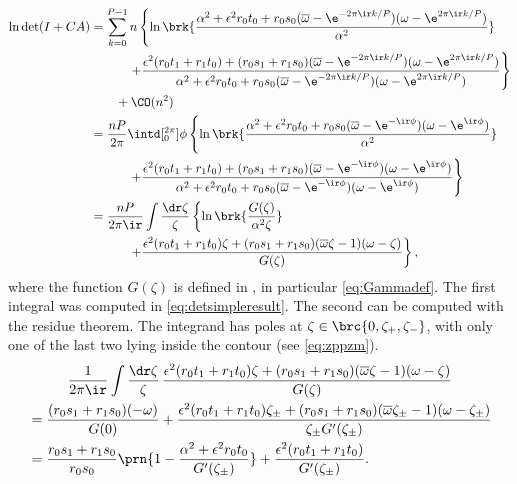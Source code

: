 \documentclass[12pt]{article}
\newcommand{\omb}{\overline{\omega}}
\begin{document}
\begin{equation}\label{eq:detrepints}
\begin{aligned}
  \ln\det(I+CA) &=  \sum_{k=0}^{P-1}
    n \left\{
      \ln\brk{ \frac{\alpha^2+\epsilon^2r_0t_0 + r_0s_0 (\omb-\e^{-2\pi\ir k/P}) (\omega-\e^{2\pi\ir k/P})} {\alpha^2}}
    \right.\\
    &\qquad\quad \left.+
      \frac{ \epsilon^2 (r_0t_1+r_1t_0) + (r_0s_1+r_1s_0) (\omb-\e^{-2\pi\ir k/P}) (\omega-\e^{2\pi\ir k/P})} { \alpha^2+\epsilon^2r_0t_0 + r_0s_0 (\omb-\e^{-2\pi\ir k/P}) (\omega-\e^{2\pi\ir k/P})}
    \right\}\\
   &\qquad +\CO(n^2)\\
    &= \frac{nP}{2\pi} \intd[_0^{2\pi}]{\phi} \left\{
     \ln\brk{ \frac{\alpha^2+\epsilon^2r_0t_0 + r_0s_0 (\omb-\e^{-\ir\phi}) (\omega-\e^{\ir\phi})} {\alpha^2}}
    \right.\\
    &\qquad\quad \left.+
      \frac{ \epsilon^2 (r_0t_1+r_1t_0) + (r_0s_1+r_1s_0) (\omb-\e^{-\ir\phi}) (\omega-\e^{\ir\phi})} { \alpha^2+\epsilon^2r_0t_0 + r_0s_0 (\omb-\e^{-\ir\phi}) (\omega-\e^{\ir\phi})}
    \right\}\\
    &= \frac{nP}{2\pi\ir} \int \frac{\dr\zeta}{\zeta} \left\{ \ln \brk{\frac{G(\zeta)}{\alpha^2\zeta}}
    \right.\\
    &\qquad\quad \left.+
      \frac{ \epsilon^2 (r_0t_1+r_1t_0)\zeta + (r_0s_1+r_1s_0) (\omb\zeta-1) (\omega-\zeta)} {G(\zeta)}
    \right\},
\end{aligned}
\end{equation}
%
where the function $G(\zeta)$ is defined in , in particular \eqref{eq:Gammadef}.
The first integral was computed in \eqref{eq:detsimpleresult}.
The second can be computed with the residue theorem.
The integrand has poles at $\zeta\in\brc{0,\zeta_+,\zeta_-}$, with only one of the last two lying inside the contour (see \eqref{eq:zppzm}).
%
\begin{multline}\label{eq:repcontoutint}
  \frac{1}{2\pi\ir} \int \frac{\dr\zeta}{\zeta}\,
    \frac{ \epsilon^2 (r_0t_1+r_1t_0)\zeta + (r_0s_1+r_1s_0) (\omb\zeta-1) (\omega-\zeta)} {G(\zeta)} \\
    \begin{aligned}
      &= \frac{(r_0s_1+r_1s_0)(-\omega)}{G(0)}
      + \frac{ \epsilon^2 (r_0t_1+r_1t_0)\zeta_\pm + (r_0s_1+r_1s_0) (\omb\zeta_\pm-1) (\omega-\zeta_\pm)} {\zeta_\pm G'(\zeta_\pm)} \\
      &= \frac{r_0s_1+r_1s_0}{r_0s_0}\prn{1-\frac{\alpha^2+\epsilon^2r_0t_0} {G'(\zeta_\pm)}}
      + \frac{ \epsilon^2 (r_0t_1+r_1t_0)} {G'(\zeta_\pm)} .
    \end{aligned}
\end{multline}
%
\end{document}
